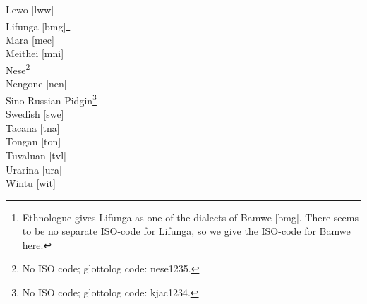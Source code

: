 ﻿\documentclass[output=paper,draft,draftmode,colorlinks,citecolor=brown]{langscibook}
\begin{document}
\begin{multicols}{2}
Lewo [lww]\\
Lifunga [bmg]\footnote{Ethnologue gives Lifunga as one of the dialects of
Bamwe [bmg]. There seems to be no separate ISO-code for Lifunga, so we give
the ISO-code for Bamwe here.}\\
Mara [mec]\\
Meithei [mni]\\
Nese\footnote{No ISO code; glottolog code: nese1235.}\\
Nengone [nen]\\
Sino-Russian Pidgin\footnote{No ISO code; glottolog code: kjac1234.}\\
Swedish [swe]\\
Tacana [tna]\\
Tongan [ton]\\
Tuvaluan [tvl]\\
Urarina [ura]\\
Wintu [wit]\\
\end{multicols}

{\sloppy\printbibliography[heading=subbibliography]}
\end{document}
